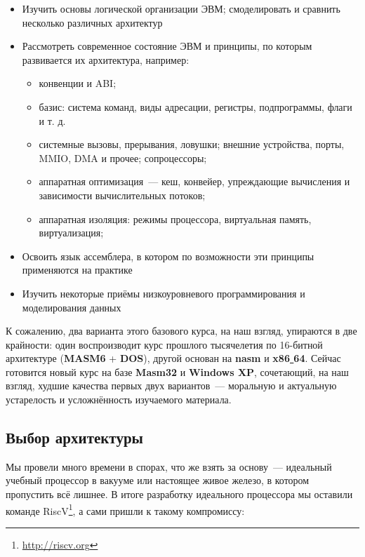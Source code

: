 \documentclass[10pt, a5paper]{article}
\begin{document}
\begin{itemize}
  \item Изучить основы логической организации ЭВМ; смоделировать и сравнить несколько различных архитектур
  \item Рассмотреть современное состояние ЭВМ и принципы, по которым развивается их архитектура, например:
\begin{itemize}
  \item конвенции и ABI;
  \item базис: система команд, виды адресации, регистры, подпрограммы, флаги и т. д.
  \item системные вызовы, прерывания, ловушки; внешние устройства, порты, MMIO, DMA и прочее; сопроцессоры;
  \item аппаратная оптимизация~--- кеш, конвейер, упреждающие вычисления и зависимости вычислительных потоков;
  \item аппаратная изоляция: режимы процессора, виртуальная память, виртуализация;
\end{itemize}


  \item Освоить язык ассемблера, в котором по возможности эти принципы применяются на практике
  \item Изучить некоторые приёмы низкоуровневого программирования и моделирования данных
\end{itemize}

К сожалению, два варианта этого базового курса, на наш взгляд, упираются в две крайности: один воспроизводит курс прошлого тысячелетия по 16-битной архитектуре (\textbf{MASM6} + \textbf{DOS}), другой основан на \textbf{nasm} и \textbf{x86\underline{ }64}. Сейчас готовится новый курс на базе \textbf{Masm32} и \textbf{Windows XP}, сочетающий, на наш взгляд, худшие качества первых двух вариантов~--- моральную и актуальную устарелость и усложнённость изучаемого материала.

\subsection*{Выбор архитектуры}

Мы провели много времени в спорах, что же взять за основу~--- идеальный учебный процессор в вакууме или настоящее живое железо, в котором пропустить всё лишнее. В итоге разработку идеального процессора мы оставили команде RiscV\footnote{\url{http://riscv.org}}, а сами пришли к такому компромиссу:
\end{document}
